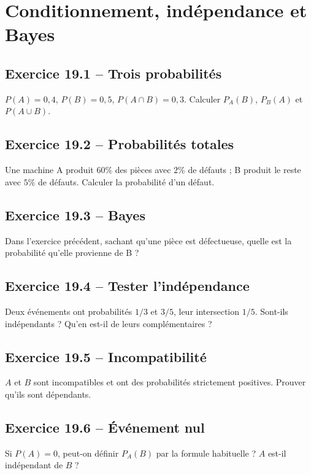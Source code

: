\chapter{Conditionnement, indépendance et Bayes}
\section*{Exercice 19.1 -- Trois probabilités}
$P(A)=0{,}4$, $P(B)=0{,}5$, $P(A\cap B)=0{,}3$. Calculer $P_A(B)$, $P_B(A)$ et $P(A\cup B)$.

\section*{Exercice 19.2 -- Probabilités totales}
Une machine A produit $60\%$ des pièces avec $2\%$ de défauts ; B produit le reste avec $5\%$ de défauts. Calculer la probabilité d'un défaut.

\section*{Exercice 19.3 -- Bayes}
Dans l'exercice précédent, sachant qu'une pièce est défectueuse, quelle est la probabilité qu'elle provienne de B ?

\section*{Exercice 19.4 -- Tester l'indépendance}
Deux événements ont probabilités $1/3$ et $3/5$, leur intersection $1/5$. Sont-ils indépendants ? Qu'en est-il de leurs complémentaires ?

\section*{Exercice 19.5 -- Incompatibilité}
$A$ et $B$ sont incompatibles et ont des probabilités strictement positives. Prouver qu'ils sont dépendants.

\section*{Exercice 19.6 -- Événement nul}
Si $P(A)=0$, peut-on définir $P_A(B)$ par la formule habituelle ? $A$ est-il indépendant de $B$ ?
